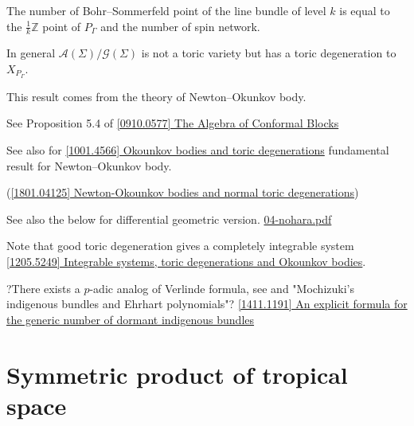 \documentclass[a4paper,dvipdfmx,reqno,12pt]{amsart}
\theoremstyle{definition}
\newcommand{\Z}{\mathbb{Z}}%
\newcommand{\mcal}[1]{\mathcal{#1}}%
\numberwithin{equation}{section}
\begin{document}
The number of Bohr--Sommerfeld point of the line bundle of level $k$ is 
equal to the $\frac{1}{k}\Z$ point of $P_{\Gamma}$ and the number of 
spin network.

In general $\mcal{A}(\Sigma)/\mcal{G}(\Sigma)$ is not a 
toric variety but has a toric degeneration to $X_{P_{\Gamma}}$.

This result comes from the theory of Newton--Okunkov body.

See Proposition 5.4 of \href{https://arxiv.org/abs/0910.0577}{[0910.0577] The Algebra of Conformal Blocks}

See also for \href{https://arxiv.org/abs/1001.4566}{[1001.4566] Okounkov bodies and toric degenerations}
 fundamental result for Newton--Okunkov body.

(\href{https://arxiv.org/abs/1801.04125}{[1801.04125] Newton-Okounkov bodies and normal toric degenerations})

See also the below for differential geometric version.
\href{http://www.official.kotaroy.com/meeting/symposium/abstract.bak/04-nohara.pdf}{04-nohara.pdf}

Note that good toric degeneration gives a completely 
integrable system \href{https://arxiv.org/abs/1205.5249}{[1205.5249] Integrable systems, toric degenerations and Okounkov bodies}.

?There exists a $p$-adic analog of Verlinde formula, see 
\cite[]{} and "Mochizuki’s indigenous bundles and Ehrhart polynomials"?
\href{https://arxiv.org/abs/1411.1191}{[1411.1191] An explicit formula for the generic number of dormant indigenous bundles}




\section{Symmetric product of tropical space}
\end{document}
